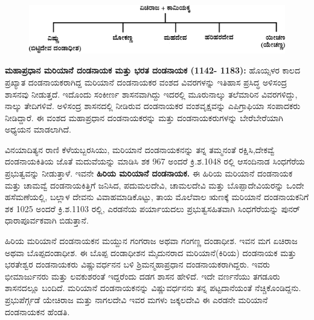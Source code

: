 \begin{figure}[H]
\includegraphics[scale=1.15]{images/chap3/chap3fig12.jpeg}
\end{figure}

\textbf{ಮಹಾಪ್ರಧಾನ ಮರಿಯಾನೆ ದಂಡನಾಯಕ ಮತ್ತು ಭರತ ದಂಡನಾಯಕ (1142- 1183):} ಹೊಯ್ಸಳರ ಕಾಲದ ಪ್ರಖ್ಯಾತ ದಂಡನಾಯಕರಾಗಿದ್ದ ಮರಿಯಾನೆ ದಂಡನಾಯಕರ ವಂಶದ ವಿವರಗಳನ್ನು ಇತಿಹಾಸ ಪ್ರಸಿದ್ಧ ಅಳಿಸಂದ್ರ ಶಾಸನವು ನೀಡುತ್ತದೆ. ಇದೊಂದು ಸಂಕೀರ್ಣ ಶಾಸನವಾಗಿದ್ದು ಇದರಲ್ಲಿ ಮೂರು\enginline{-}ನಾಲ್ಕು ತಲೆಮಾರಿನ ವಿವರಗಳಿದ್ದು, ನಾಲ್ಕು ತೇದಿಗಳಿವೆ. ಅಳಿಸಂದ್ರ ಶಾಸನದಲ್ಲಿ ನೀಡಿರುವ ದಂಡನಾಯಕರ ವಂಶವೃಕ್ಷವನ್ನು ಎಪಿಗ್ರಾಫಿಯಾ ಸಂಪಾದಕರು ನೀಡಿದ್ದಾರೆ. ಈ ವಂಶದ ಮಹಾಪ್ರಧಾನ ದಂಡನಾಯಕರನ್ನು ಮತ್ತು ದಂಡನಾಯಕರುಗಳನ್ನು ಬೇರೆಬೇರೆಯಾಗಿ ಅಧ್ಯಯನ ಮಾಡಲಾಗಿದೆ.

ವಿನಯಾದಿತ್ಯನ ರಾಣಿ ಕೆಳೆಯಬ್ಬರಸಿಯು, ಮರಿಯಾನೆ ದಂಡನಾಯಕನನ್ನು ತನ್ನ ತಮ್ಮನಂತೆ ರಕ್ಷಿಸಿ,\break ದೇಕವ್ವೆ ದಂಡನಾಯಕಿತಿಯ ಜೊತೆ ಮದುವೆಯನ್ನು ಮಾಡಿಸಿ ಶಕ 967 ಅಂದರೆ ಕ್ರಿ.ಶ.1048 ರಲ್ಲಿ ಆಸಂದಿನಾಡ ಸಿಂಧಗೆರೆಯ ಪ್ರಭುತ್ವವನ್ನು ನೀಡುತ್ತಾಳೆ. ಇವನೇ \textbf{ಹಿರಿಯ ಮರಿಯಾನೆ ದಂಡನಾಯಕ. }ಈ ಹಿರಿಯ ಮರಿಯಾನೆ ದಂಡನಾಯಕ ಮತ್ತು ಚಾಮವ್ವೆ ದಂಡನಾಯಕಿತ್ತಿಗೆ ಜನಿಸಿದ, ಪದುಮಲದೇವಿ, ಚಾಮಲದೇವಿ ಮತ್ತು ಬೊಪ್ಪಾದೇವಿಯರನ್ನು ಒಂದೇ ಹಸೆಮಣೆಯಲ್ಲಿ, ಬಲ್ಲಾಳ ದೇವನು ವಿವಾಹಮಾಡಿಕೊಟ್ಟು, ತಾಯ ಮೊಲೆವಾಲ ಋಣಕ್ಕೆ ಮರಿಯಾನೆ ದಂಡನಾಯಕನಿಗೆ ಶಕ 1025 ಅಂದರೆ ಕ್ರಿ.ಶ.1103 ರಲ್ಲಿ, ಎರಡನೆಯ ಪರ್ಯಾಯದಲು ಪ್ರಭುತ್ವಸಹಿತವಾಗಿ ಸಿಂಧಗೆರೆಯನ್ನು ಪುನರ್​ ಧಾರಾಪೂರ್ವಕವಾಗಿ ಬಿಡುತ್ತಾನೆ.

ಹಿರಿಯ ಮರಿಯಾನೆ ದಂಡನಾಯಕನ ಮಯ್ದುನ ಗಂಗರಾಜ ಅಥವಾ ಗಂಗಣ್ಣ ದಂಡಾಧೀಶ. ಇವನ ಮಗ ಏಚಿರಾಜ ಅಥವಾ ಬೊಪ್ಪದಂಡಾಧೀಶ. ಈ ಬೊಪ್ಪ ದಂಡಾಧೀಶನ ಮೈದುನರಾದ ಮರಿಯಾನೆ(ಕಿರಿಯ) ದಂಡನಾಯಕ ಮತ್ತು ಭರತೇಶ್ವರ ದಂಡನಾಯಕರು ವಿಷ್ಣುವರ್ಧನನ ಬಳಿ ಶ್ರಿಮನ್ಮಹಾಪ್ರಧಾನ ದಂಡನಾಯಕರಾಗಿದ್ದರು. ಇವರು ಭೀಮಾರ್ಜುನರು ಮತ್ತು ಲವಕುಶರಂತೆ ಇದ್ದರೆಂದು ದಡಗ ಶಾಸನ ಹೇಳಿದೆ. ಇದೇ ವರ್ಣನೆಯು ತಗಡೂರು ಶಾಸನದಲ್ಲೂ ಬಂದಿದೆ. ಮರಿಯಾನೆ ದಂಡನಾಯಕನನ್ನು ವಿಷ್ಣುವರ್ಧನನು ತನ್ನ ಪಟ್ಟದಾನೆಯಂತೆ ನೆಚ್ಚಿಕೊಂಡಿದ್ದನು. ಪ್ರಭುಪೆರ್ಗ್ಗಡೆ ಯೇಚಿರಾಜ ಮತ್ತು ನಾಗಲದೇವಿ ಇವರ ಮಗಳು ಜಕ್ಕಲದೇವಿ ಈ ಎರಡನೇ ಮರಿಯಾನೆ ದಂಡನಾಯಕನ ಹೆಂಡತಿ.

